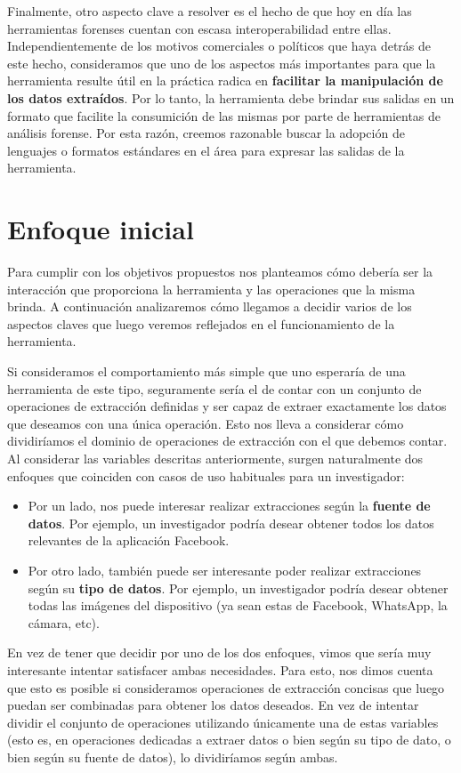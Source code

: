 Finalmente, otro aspecto clave a resolver es el hecho de que hoy en día las herramientas forenses cuentan con escasa interoperabilidad entre ellas. Independientemente de los motivos comerciales o políticos que haya detrás de este hecho, consideramos que uno de los aspectos más importantes para que la herramienta resulte útil en la práctica radica en \textbf{facilitar la manipulación de los datos extraídos}. Por lo tanto, la herramienta debe brindar sus salidas en un formato que facilite la consumición de las mismas por parte de herramientas de análisis forense. Por esta razón, creemos razonable buscar la adopción de lenguajes o formatos estándares en el área para expresar las salidas de la herramienta.

\section{Enfoque inicial}
Para cumplir con los objetivos propuestos nos planteamos cómo debería ser la interacción que proporciona la herramienta y las operaciones que la misma brinda. A continuación analizaremos cómo llegamos a decidir varios de los aspectos claves que luego veremos reflejados en el funcionamiento de la herramienta.

Si consideramos el comportamiento más simple que uno esperaría de una herramienta de este tipo, seguramente sería el de contar con un conjunto de operaciones de extracción definidas y ser capaz de extraer exactamente los datos que deseamos con una única operación. Esto nos lleva a considerar cómo dividiríamos el dominio de operaciones de extracción con el que debemos contar. Al considerar las variables descritas anteriormente, surgen naturalmente dos enfoques que coinciden con casos de uso habituales para un investigador:

\begin{itemize}
\item Por un lado, nos puede interesar realizar extracciones según la \textbf{fuente de datos}. Por ejemplo, un investigador podría desear obtener todos los datos relevantes de la aplicación Facebook.
\item Por otro lado, también puede ser interesante poder realizar extracciones según su \textbf{tipo de datos}. Por ejemplo, un investigador podría desear obtener todas las imágenes del dispositivo (ya sean estas de Facebook, WhatsApp, la cámara, etc).
\end{itemize}

En vez de tener que decidir por uno de los dos enfoques, vimos que sería muy interesante intentar satisfacer ambas necesidades. Para esto, nos dimos cuenta que esto es posible si consideramos operaciones de extracción concisas que luego puedan ser combinadas para obtener los datos deseados. En vez de intentar dividir el conjunto de operaciones utilizando únicamente una de estas variables (esto es, en operaciones dedicadas a extraer datos o bien según su tipo de dato, o bien según su fuente de datos), lo dividiríamos según ambas.

